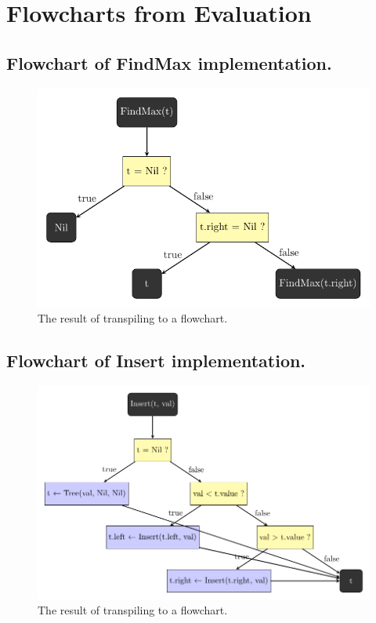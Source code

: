\chapter{Flowcharts from Evaluation}
\label{appendixC}

\section{Flowchart of FindMax implementation.}
\label{Flowchart of FindMax implementation.}

\begin{figure}[ht!]
    \centering
    \includegraphics[scale=.6]{assets/chapter6/bst/FindMax_ibp.pdf}
    \caption{The result of transpiling  to a flowchart.}
    \label{findMaxIBP}
\end{figure}

\section{Flowchart of Insert implementation.}
\label{Flowchart of Insert implementation.}

\begin{figure}[ht!]
    \centering
    \includegraphics[scale=.6]{assets/chapter6/bst/Insert_ibp.pdf}
    \caption{The result of transpiling  to a flowchart.}
    \label{insertIBP}
\end{figure}

